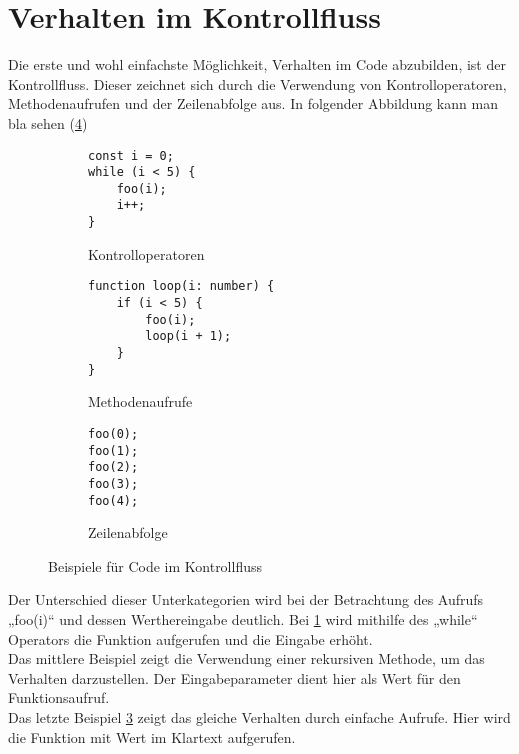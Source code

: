 \section{Verhalten im Kontrollfluss}
Die erste und wohl einfachste Möglichkeit, Verhalten im Code abzubilden, ist der Kontrollfluss. Dieser zeichnet sich durch die Verwendung von Kontrolloperatoren, Methodenaufrufen und der Zeilenabfolge aus. \cite{fiveLines.2023}
In folgender Abbildung kann man bla sehen (\ref{fig:Kontrollfluss})
\begin{figure}[ht]
    \begin{subfigure}[t]{0.30\textwidth}
        \centering
        \begin{minipage}[t]{\linewidth}
            \begin{verbatim}
const i = 0;
while (i < 5) {
    foo(i);
    i++;
}
            \end{verbatim}
        \end{minipage}
        \caption{Kontrolloperatoren}
        \label{fig:Kontrolloperatoren}
    \end{subfigure}
    \hfill
    \begin{subfigure}[t]{0.30\textwidth}
        \centering
        \begin{minipage}[t]{\linewidth}
            \begin{verbatim}
function loop(i: number) {
    if (i < 5) {
        foo(i);
        loop(i + 1);
    }
}
            \end{verbatim}
        \end{minipage}
        \caption{Methodenaufrufe}
        \label{fig:Methodenaufrufe}
    \end{subfigure}
    \hfill
    \begin{subfigure}[t]{0.30\textwidth}
        \centering
        \begin{minipage}[t]{\linewidth}
            \begin{verbatim}
foo(0);
foo(1);
foo(2);
foo(3);
foo(4);
            \end{verbatim}
        \end{minipage}
        \caption{Zeilenabfolge}
        \label{fig:Zeilenabfolge}
    \end{subfigure}
    \caption{Beispiele für Code im Kontrollfluss \cite{fiveLines.2023}}
    \label{fig:Kontrollfluss}
\end{figure}

Der Unterschied dieser Unterkategorien wird bei der Betrachtung des Aufrufs „foo(i)“ und dessen Werthereingabe deutlich. Bei \ref{fig:Kontrolloperatoren} wird mithilfe des „while“ Operators die Funktion aufgerufen und die Eingabe erhöht.\\ Das mittlere Beispiel zeigt die Verwendung einer rekursiven Methode, um das Verhalten darzustellen. Der Eingabeparameter dient hier als Wert für den Funktionsaufruf.\\ Das letzte Beispiel \ref{fig:Zeilenabfolge} zeigt das gleiche Verhalten durch einfache Aufrufe. Hier wird die Funktion mit Wert im Klartext aufgerufen.

